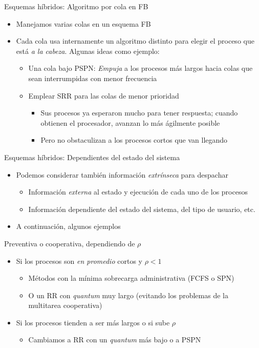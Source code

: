 \documentclass[presentation]{beamer}
\begin{document}
\begin{frame}[label={sec:org70f6280}]{Esquemas híbridos: Algoritmo por cola en FB}
\begin{itemize}
\item Manejamos varias colas en un esquema FB
\item Cada cola usa internamente un algoritmo distinto para elegir el
proceso que está \emph{a la cabeza}. Algunas ideas como ejemplo:
\begin{itemize}
\item Una cola bajo PSPN: \emph{Empuja} a los procesos más largos hacia
colas que sean interrumpidas con menor frecuencia
\item Emplear SRR para las colas de menor prioridad
\begin{itemize}
\item Sus procesos ya esperaron mucho para tener respuesta; cuando
obtienen el procesador, avanzan lo más ágilmente posible
\item Pero no obstaculizan a los procesos cortos que van llegando
\end{itemize}
\end{itemize}
\end{itemize}
\end{frame}

\begin{frame}[label={sec:org41e599c}]{Esquemas híbridos: Dependientes del estado del sistema}
\begin{itemize}
\item Podemos considerar también información \emph{extrínseca} para despachar
\begin{itemize}
\item Información \emph{externa} al estado y ejecución de cada uno de los
procesos
\item Información dependiente del estado del sistema, del tipo de
usuario, etc.
\end{itemize}
\item A continuación, algunos ejemplos
\end{itemize}
\end{frame}

\begin{frame}[label={sec:org7a3a634}]{Preventiva o cooperativa, dependiendo de \(\rho\)}
\begin{itemize}
\item Si los procesos son \emph{en promedio} cortos y \(\rho < 1\)
\begin{itemize}
\item Métodos con la mínima sobrecarga administrativa (FCFS o SPN)
\item O un RR con \emph{quantum} muy largo (evitando los problemas de la
multitarea cooperativa)
\end{itemize}
\item Si los procesos tienden a ser más largos o si sube \(\rho\)
\begin{itemize}
\item Cambiamos a RR con un \emph{quantum} más bajo o a PSPN
\end{itemize}
\end{itemize}
\end{frame}
\end{document}
